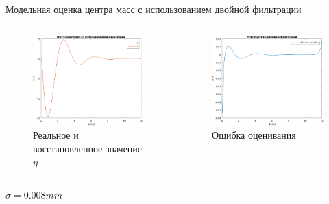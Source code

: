 \documentclass[10pt]{beamer}
\begin{document}
\begin{frame}{Модельная оценка центра масс с использованием двойной фильтрации}
	\begin{columns}
		\begin{figure}[h!]
			\includegraphics[width=1\linewidth]{images/eta_after_filtering.png}
			\caption{Реальное и восстановленное значение $\eta$}
		\end{figure}
		\begin{figure}[h!]
			\includegraphics[width=1\linewidth]{images/error_efter_filtering.png}
			\caption{Ошибка оценивания}
		\end{figure}
	\end{columns}
$\sigma=0.008mm$
\end{frame}
\end{document}
